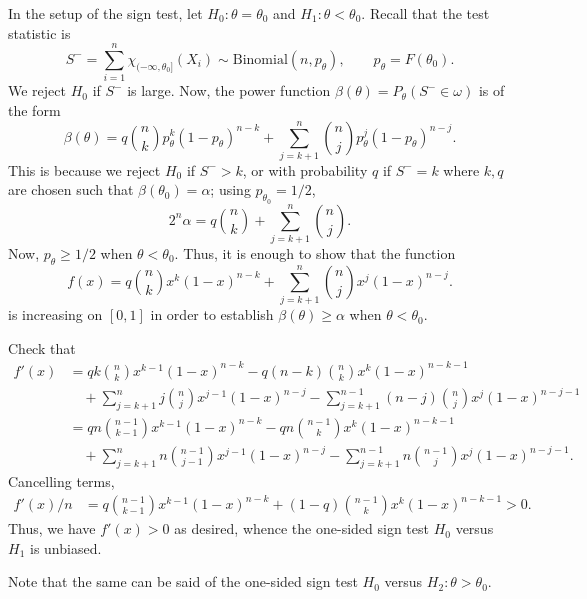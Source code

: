 \documentclass[10pt]{article}
\begin{document}
    In the setup of the sign test, let $H_0: \theta = \theta_0$ and $H_1:
    \theta < \theta_0$. Recall that the test statistic is \[
        S^- = \sum_{i = 1}^n \chi_{(-\infty, \theta_0]}(X_i)
            \sim \text{Binomial}(n, p_\theta), \qquad
            p_\theta = F(\theta_0).
    \] We reject $H_0$ if $S^-$ is large. Now, the power function
    $\beta(\theta) = P_\theta(S^- \in \omega)$ is of the form \[
        \beta(\theta) = q \binom{n}{k} p_\theta^k (1 - p_\theta)^{n - k} +
            \sum_{j = k + 1}^n \binom{n}{j} p_\theta^j (1 - p_\theta)^{n - j}.
    \] This is because we reject $H_0$ if $S^- > k$, or with probability $q$
    if $S^- = k$ where $k, q$ are chosen such that $\beta(\theta_0) = \alpha$;
    using $p_{\theta_0} = 1 / 2$, \[
        2^n \alpha = q \binom{n}{k} + \sum_{j = k + 1}^n \binom{n}{j}.
    \] Now, $p_\theta \geq 1 / 2$ when $\theta < \theta_0$. Thus, it is
    enough to show that the function \[
        f(x) = q \binom{n}{k} x^k (1 - x)^{n - k} + \sum_{j = k + 1}^n
        \binom{n}{j} x^j (1 - x)^{n - j}.
    \] is increasing on $[0, 1]$ in order to establish $\beta(\theta) \geq
    \alpha$ when $\theta < \theta_0$.

    Check that \begin{align*}
        f'(x) &= qk \binom{n}{k} x^{k - 1} (1 - x)^{n - k}
            - q(n - k) \binom{n}{k} x^{k} (1 - x)^{n - k - 1} \\
            &\quad + \sum_{j = k + 1}^n
                j\binom{n}{j} x^{j - 1} (1 - x)^{n - j}
            - \sum_{j = k + 1}^{n - 1}
                (n - j)\binom{n}{j} x^{j} (1 - x)^{n - j - 1} \\
        &= qn \binom{n - 1}{k - 1} x^{k - 1} (1 - x)^{n - k}
            - qn \binom{n - 1}{k} x^{k} (1 - x)^{n - k - 1} \\
            &\quad + \sum_{j = k + 1}^n
                n\binom{n - 1}{j - 1} x^{j - 1} (1 - x)^{n - j}
            - \sum_{j = k + 1}^{n - 1}
                n\binom{n - 1}{j} x^{j} (1 - x)^{n - j - 1}.
    \end{align*}
    Cancelling terms, \begin{align*}
        f'(x) / n &= q \binom{n - 1}{k - 1} x^{k - 1} (1 - x)^{n - k}
            + (1 - q) \binom{n - 1}{k} x^{k} (1 - x)^{n - k - 1} > 0.
    \end{align*}
    Thus, we have $f'(x) > 0$ as desired, whence the one-sided sign test $H_0$
    versus $H_1$ is unbiased.

    Note that the same can be said of the one-sided sign test $H_0$ versus
    $H_2: \theta > \theta_0$.
\end{document}
